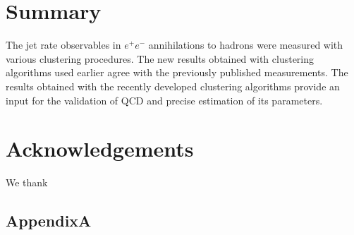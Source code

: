 \section{Summary}                      
\label{sec:summary}
The jet rate observables  in $e^+e^-$ 
annihilations to hadrons were measured with various clustering procedures.
The new results obtained with 
clustering algorithms  used earlier agree with the previously published measurements.
The results obtained with the recently developed clustering algorithms  
provide an input for the validation of QCD and precise estimation of its parameters.
%
\section*{Acknowledgements}
\label{sec:acknowledgements}
We thank 
\FloatBarrier
\begin{appendices}
\section{AppendixA}
\label{sec:appendixA}


\end{appendices}

